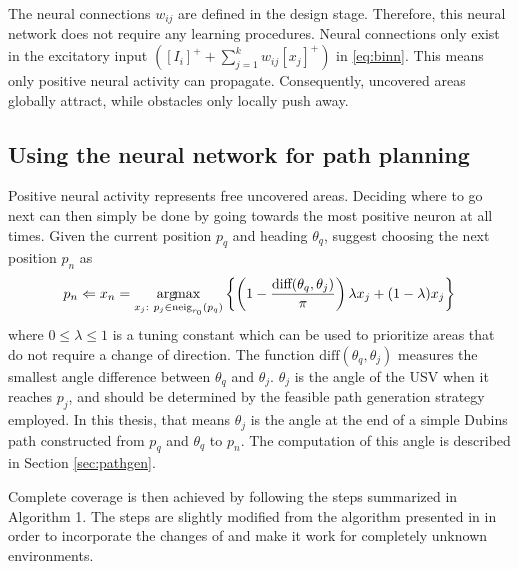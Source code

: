 The neural connections $w_{ij}$ are defined in the design stage. Therefore, this neural network does not require any learning procedures. Neural connections only exist in the excitatory input $\left([I_i]^{+} + \sum^k_{j=1}w_{ij}[x_j]^{+} \right)$ in \eqref{eq:binn}. This means only positive neural activity can propagate. Consequently, uncovered areas globally attract, while obstacles only locally push away.

\subsection{Using the neural network for path planning}

Positive neural activity represents free uncovered areas. Deciding where to go next can then simply be done by going towards the most positive neuron at all times. Given the current position $p_q$ and heading $\theta_q$, \citet{Scibilia2012} suggest choosing the next position $p_n$ as
\begin{equation} \label{eq:binn_pos}
p_n \Leftarrow x_n = \operatorname*{arg\!max}_{x_j:\ p_j \in \text{neig}_{r_0}(p_q)} \left\{ \left( 1 - \frac{\text{diff}(\theta_q,\theta_j)}{\pi} \right)\lambda x_j + (1-\lambda)x_j \right\}
\end{equation}
where $0 \leq \lambda \leq 1$ is a tuning constant which can be used to prioritize areas that do not require a change of direction. The function $\text{diff}(\theta_q,\theta_j)$ measures the smallest angle difference between $\theta_q$ and $\theta_j$. $\theta_j$ is the angle of the USV when it reaches $p_j$, and should be determined by the feasible path generation strategy employed. In this thesis, that means $\theta_j$ is the angle at the end of a simple Dubins path constructed from $p_q$ and $\theta_q$ to $p_n$. The computation of this angle is described in Section \ref{sec:pathgen}.

Complete coverage is then achieved by following the steps summarized in Algorithm 1. The steps are slightly modified from the algorithm presented in \citet{Scibilia2012} in order to incorporate the changes of \citet{luo2008bioinspired} and make it work for completely unknown environments.

